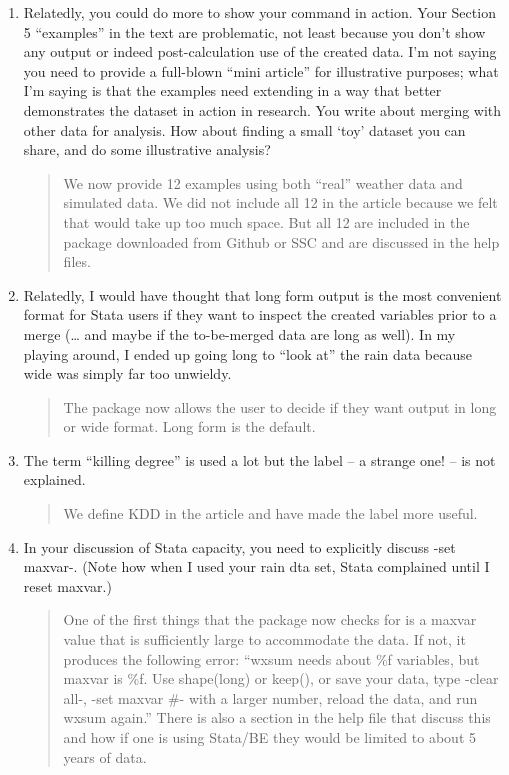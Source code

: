 \documentclass{article}[11pt]
\begin{document}
\begin{enumerate}
    \item Relatedly, you could do more to show your command in action. Your Section 5 ``examples'' in the text are problematic, not least because you don’t show any output or indeed post-calculation use of the created data. I’m not saying you need to provide a full-blown ``mini article'' for illustrative purposes; what I’m saying is that the examples need extending in a way that better demonstrates the dataset in action in research. You write about merging with other data for analysis. How about finding a small ‘toy’ dataset you can share, and do some illustrative analysis?
    \begin{quote}
        We now provide 12 examples using both ``real'' weather data and simulated data. We did not include all 12 in the article because we felt that would take up too much space. But all 12 are included in the package downloaded from Github or SSC and are discussed in the help files. 
    \end{quote}

    \item Relatedly, I would have thought that long form output is the most convenient format for Stata users if they want to inspect the created variables prior to a merge (… and maybe if the to-be-merged data are long as well). In my playing around, I ended up going long to ``look at'' the rain data because wide was simply far too unwieldy.
    \begin{quote}
        The package now allows the user to decide if they want output in long or wide format. Long form is the default.
    \end{quote}

    \item The term ``killing degree'' is used a lot but the label – a strange one! – is not explained.
    \begin{quote}
        We define KDD in the article and have made the label more useful.
    \end{quote}

    \item In your discussion of Stata capacity, you need to explicitly discuss -set maxvar-. (Note how when I used your rain dta set, Stata complained until I reset maxvar.)
    \begin{quote}
        One of the first things that the package now checks for is a maxvar value that is sufficiently large to accommodate the data. If not, it produces the following error: ``wxsum needs about \%f variables, but maxvar is \%f. Use shape(long) or keep(), or save your data, type -clear all-, -set maxvar \#- with a larger number, reload the data, and run wxsum again.'' There is also a section in the help file that discuss this and how if one is using Stata/BE they would be limited to about 5 years of data.
    \end{quote}


\end{enumerate}
\end{document}
